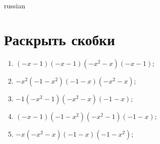 \documentclass[20pt,a4paper]{article}
\begin{document}
\begin{otherlanguage*}{russian}

\section{Раскрыть скобки}\begin{enumerate}
\item $(-x - 1)(-x - 1)(-x^2 - x)(-x - 1)$;
\item $-x^2(-1 - x^2)(-1 - x)(-x^2 - x)$;
\item $-1(-x^2 - 1)(-x^2 - x)(-1 - x)$;
\item $(-x - 1)(-1 - x^2)(-x^2 - 1)(-1 - x)$;
\item $-x(-x^2 - x)(-1 - x)(-1 - x^2)$;
\end{enumerate}
\end{otherlanguage*}
\end{document}
